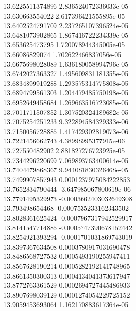 {13.6225511374896 2.836524072336033e-05 \\
13.630663554022 2.617396421555895e-05 \\
13.6402524791709 2.237265107396524e-05 \\
13.6481073902865 1.867416722234339e-05 \\
13.653625473795 1.720078944345005e-05 \\
13.66086829074 1.702622466837056e-05 \\
13.6675698028089 1.636180058994796e-05 \\
13.6742027363327 1.495609831181355e-05 \\
13.6834899919288 1.293575314775808e-05 \\
13.6894799561303 1.204479485750198e-05 \\
13.6952649458684 1.269663516723085e-05 \\
13.7011711507852 1.307520324189682e-05 \\
13.7075254251233 9.322894584329333e-06 \\
13.7150056728886 1.417429302819073e-06 \\
13.7221456662743 4.38998995377915e-06 \\
13.727550482902 2.881827276723925e-05 \\
13.7344296220699 7.069893763400614e-05 \\
13.7404479868367 9.944081830326468e-05 \\
13.7499907857943 0.0001237975084222853 \\
13.7652834790444 -3.647985067800619e-06 \\
13.7791495329973 -0.0003662403032649308 \\
13.793498654468 -0.0007535233162343502 \\
13.8028361625424 -0.0007967317942529917 \\
13.8141547714886 -0.0005747390678152442 \\
13.8254921393294 -0.0001701031869743019 \\
13.8397367634508 0.0003780917031690478 \\
13.8486568727532 0.0005493190255947411 \\
13.8567628190214 0.0005282192141748965 \\
13.8661350300313 0.0004134041373617947 \\
13.8772763361529 0.0002694727445486933 \\
13.8907698039129 0.0001274054229725152 \\
13.9059453693064 1.162170883617364e-05 \\
}
